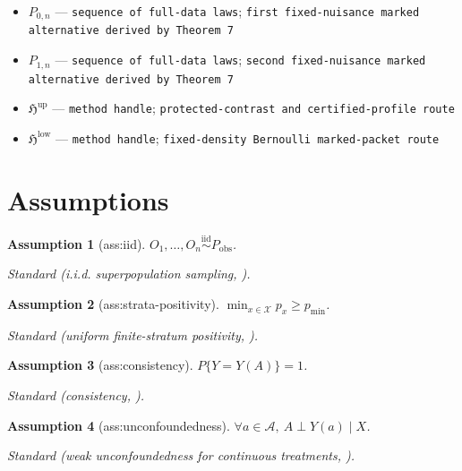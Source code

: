 \documentclass{article}
\newtheorem{assumption}{Assumption}
\begin{document}
\begin{itemize}
  \item \(P_{0,n}\) --- \texttt{sequence of full-\allowbreak{}data laws}; \texttt{first fixed-\allowbreak{}nuisance marked alternative derived by Theorem 7}
  \item \(P_{1,n}\) --- \texttt{sequence of full-\allowbreak{}data laws}; \texttt{second fixed-\allowbreak{}nuisance marked alternative derived by Theorem 7}
  \item \(\mathfrak H^{\mathrm{up}}\) --- \texttt{method handle}; \texttt{protected-\allowbreak{}contrast and certified-\allowbreak{}profile route}
  \item \(\mathfrak H^{\mathrm{low}}\) --- \texttt{method handle}; \texttt{fixed-\allowbreak{}density Bernoulli marked-\allowbreak{}packet route}
\end{itemize}

\section{Assumptions}

\begin{assumption}[ass:iid]\label{ass:iid}
\(O_1,\ldots,O_n\stackrel{\mathrm{iid}}{\sim}P_{\mathrm{obs}}\).
\par\smallskip\noindent\emph{Standard} (i.i.d. superpopulation sampling, \cite{HuangZhang2023}).
\end{assumption}

\begin{assumption}[ass:strata-positivity]\label{ass:strata-positivity}
\(\min_{x\in\mathcal X}p_x\ge p_{\min}\).
\par\smallskip\noindent\emph{Standard} (uniform finite-stratum positivity, \cite{HuangZhang2023}).
\end{assumption}

\begin{assumption}[ass:consistency]\label{ass:consistency}
\(P\{Y=Y(A)\}=1\).
\par\smallskip\noindent\emph{Standard} (consistency, \cite{HuangZhang2023}).
\end{assumption}

\begin{assumption}[ass:unconfoundedness]\label{ass:unconfoundedness}
\(\forall a\in\mathcal A,\ A\perp Y(a)\mid X\).
\par\smallskip\noindent\emph{Standard} (weak unconfoundedness for continuous treatments, \cite{HuangZhang2023}).
\end{assumption}
\end{document}
